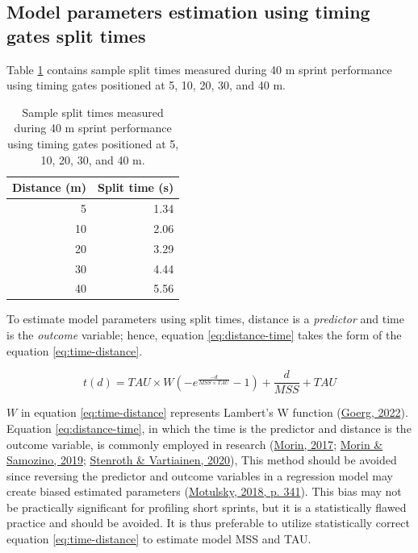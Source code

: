 \documentclass[fleqn,10pt,lineno]{wlpeerj} %
\begin{document}
\hypertarget{model-parameters-estimation-using-timing-gates-split-times}{%
\subsection{Model parameters estimation using timing gates split times}\label{model-parameters-estimation-using-timing-gates-split-times}}

Table \ref{tab:example-split-times} contains sample split times measured during 40 m sprint performance using timing gates positioned at 5, 10, 20, 30, and 40 m.



\begin{table}

\caption{\label{tab:example-split-times}Sample split times measured during 40 m sprint performance using timing gates positioned at 5, 10, 20, 30, and 40 m.}
\centering
\begin{tabular}[t]{rr}
\toprule
Distance (m) & Split time (s)\\
\midrule
5 & 1.34\\
10 & 2.06\\
20 & 3.29\\
30 & 4.44\\
40 & 5.56\\
\bottomrule
\end{tabular}
\end{table}

To estimate model parameters using split times, distance is a \emph{predictor} and time is the \emph{outcome} variable; hence, equation \eqref{eq:distance-time} takes the form of the equation \eqref{eq:time-distance}.

\begin{equation}
  t(d) = TAU \times W(-e^{\frac{-d}{MSS \times TAU}} - 1) + \frac{d}{MSS} + TAU \label{eq:time-distance}
\end{equation}

\(W\) in equation \eqref{eq:time-distance} represents Lambert's W function (\protect\hyperlink{ref-R-LambertW}{Goerg, 2022}). Equation \eqref{eq:distance-time}, in which the time is the predictor and distance is the outcome variable, is commonly employed in research (\protect\hyperlink{ref-morinSpreadsheetSprintAcceleration2017}{Morin, 2017}; \protect\hyperlink{ref-morinSpreadsheetSprintAcceleration2019}{Morin \& Samozino, 2019}; \protect\hyperlink{ref-stenrothSpreadsheetSprintAcceleration2020}{Stenroth \& Vartiainen, 2020}), This method should be avoided since reversing the predictor and outcome variables in a regression model may create biased estimated parameters (\protect\hyperlink{ref-motulskyIntuitiveBiostatisticsNonmathematical2018}{Motulsky, 2018, p. 341}). This bias may not be practically significant for profiling short sprints, but it is a statistically flawed practice and should be avoided. It is thus preferable to utilize statistically correct equation \eqref{eq:time-distance} to estimate model MSS and TAU.
\end{document}
